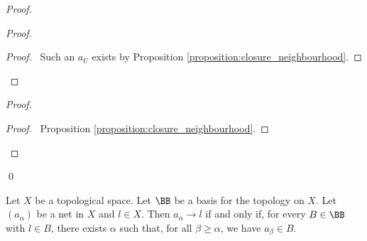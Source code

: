 \begin{proof}
    \pf
    \begin{proof}
        \begin{proof}
            \pf\ Such an $a_U$ exists by Proposition \ref{proposition:closure_neighbourhood}.
        \end{proof}
    \end{proof}
    \begin{proof}
        \qedstep
        \begin{proof}
            \pf\ Proposition \ref{proposition:closure_neighbourhood}.
        \end{proof}
    \end{proof}
    \qed
\end{proof}

\begin{proposition}
    \label{proposition:convergence_basis}
    Let $X$ be a topological space. Let $\BB$ be a basis for the topology on $X$.
    Let $(a_\alpha)$ be a net in $X$ and $l \in X$. Then $a_\alpha \rightarrow l$ if and only if, for every $B \in \BB$ with $l \in B$,
    there exists $\alpha$ such that, for all $\beta \geq \alpha$, we have $a_\beta \in B$.
\end{proposition}

